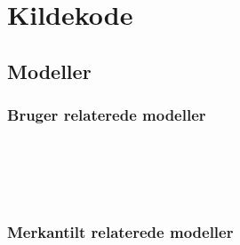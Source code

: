\chapter{Kildekode}

\section{Modeller}
\label{appendix:models}

\subsection{Bruger relaterede modeller}
\label{appendix:user-model}

\inputminted{csharp}{codefiles/models/ApplicationUser.cs}
\label{minted:application-user}

\inputminted{csharp}{codefiles/models/Customer.cs}
\label{minted:customer}

\inputminted{csharp}{codefiles/models/Employee.cs}
\label{minted:employee}

\inputminted{csharp}{codefiles/models/Guest.cs}
\label{minted:guest}

\inputminted{csharp}{codefiles/models/Address.cs}
\label{minted:address}

\inputminted{csharp}{codefiles/models/Company.cs}
\label{minted:company}

\subsection{Merkantilt relaterede modeller}
\label{appendix:mercantile-model}

\inputminted{csharp}{codefiles/models/Product.cs}
\label{minted:product}

\inputminted{csharp}{codefiles/models/Tag.cs}
\label{minted:tag}

\inputminted{csharp}{codefiles/models/Order.cs}
\label{minted:order}

\inputminted{csharp}{codefiles/models/OrderItem.cs}
\label{minted:order-item}

\inputminted{csharp}{codefiles/models/SpecialOrderInstruction.cs}
\label{minted:special-order-instruction}

\inputminted{csharp}{codefiles/models/Basket.cs}
\label{minted:basket}

\inputminted{csharp}{codefiles/models/BasketItem.cs}
\label{minted:basket-item}

\inputminted{csharp}{codefiles/models/BasketActivity.cs}
\label{minted:basketactivity}